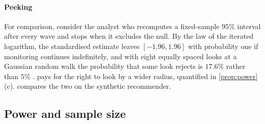\paragraph{Peeking}
For comparison, consider the analyst who recomputes a fixed-sample $95\%$ interval after every wave and stops when it excludes the null. By the law of the iterated logarithm, the standardised estimate leaves $[-1.96,1.96]$ with probability one if monitoring continues indefinitely, and with eight equally spaced looks at a Gaussian random walk the probability that some look rejects is $17.6\%$ rather than $5\%$ \citep{armitage1969}.  pays for the right to look by a wider radius, quantified in \cref{prop:power}(c).  compares the two on the synthetic recommender.

\subsection{Power and sample size}\label{sec:meas-power}

